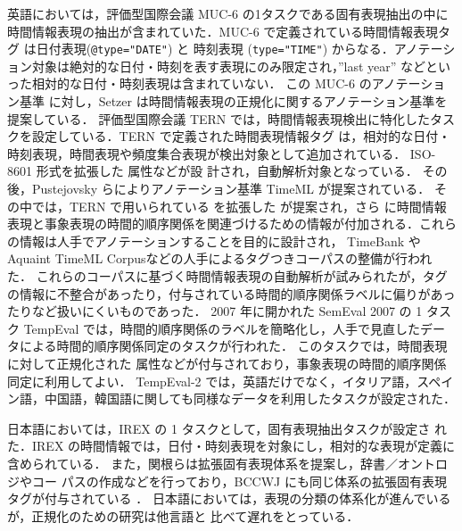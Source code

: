 \documentclass[japanese]{jnlp_1.4}
\newcommand{\modified}[1]{}
\def\timex{}
\def\timexii{}
\def\timexiii{}
\def\value{}
\begin{document}
英語においては，評価型国際会議 MUC-6 \cite{MUC6} の1タスクである固有表現抽出の中に時間情報表現の抽出が含まれていた．MUC-6 で定義されている時間情報表現タグ \timex は日付表現({\tt @type="DATE"}) と 時刻表現 ({\tt type="TIME"}) からなる．アノテーション対象は絶対的な日付・時刻を表す表現にのみ限定され，''last year'' などといった相対的な日付・時刻表現は含まれていない．
この MUC-6 のアノテーション基準 \timex に対し，Setzer は時間情報表現の正規化に関するアノテーション基準を提案している\cite{Setzer-2001}．
評価型国際会議 TERN \cite{TERN} では，時間情報表現検出に特化したタスクを設定している．TERN で定義された時間表現情報タグ \timexii は，相対的な日付・時刻表現，時間表現や頻度集合表現が検出対象として追加されている．
\modified{時間表現の正規化情報を記述する}ISO-8601 形式を拡張した \value 属性などが設
計され，\modified{こちらも}自動解析対象となっている．
その後，Pustejovsky らによりアノテーション基準 TimeML \cite{TimeML}が提案されている．
その中では，TERN で用いられている \timexii を拡張した \timexiii が提案され，さら
に時間情報表現と事象表現の時間的順序関係を関連づけるための情報が付加される．これらの情報は人手でアノテーションすることを目的に設計され，
TimeBank \cite{TimeBank}や Aquaint TimeML Corpusなどの人手によるタグつきコーパスの整備が行われた．
これらのコーパスに基づく時間情報表現の自動解析\cite{Boguraev-2005,Mani-2006}が試みられたが，タグの情報に不整合があったり，付与されている時間的順序関係ラベルに偏りがあったりなど扱いにくいものであった\cite{Boguraev-2006}．
2007 年に開かれた SemEval 2007 の 1 タスク TempEval \cite{TempEval} では，時間的順序関係のラベルを簡略化し，人手で見直したデータによる時間的順序関係同定のタスクが行われた．
このタスクでは，時間表現に対して正規化された \value 属性などが付与されており，事象表現の時間的順序関係同定に利用してよい．
TempEval-2 \cite{TempEval2} では，英語だけでなく，イタリア語，スペイン語，中国語，韓国語に関しても同様なデータを利用したタスクが設定された．

日本語においては，IREX \cite{IREX}の 1 タスクとして，固有表現抽出タスクが設定さ
れた．IREX の時間情報では，日付・時刻表現を対象にし，相対的な表現が定義に含められている．
また，関根らは拡張固有表現体系を提案し，辞書／オントロジやコー
パスの作成などを行っており，BCCWJ にも同じ体系の拡張固有表現タグが付与されている
\cite{Hashimoto-2010}．
日本語においては，表現の分類の体系化が進んでいるが，正規化のための研究は他言語と
比べて遅れをとっている．



\subsection{\modified{コーパスアノテーションの標準化}}
\end{document}
